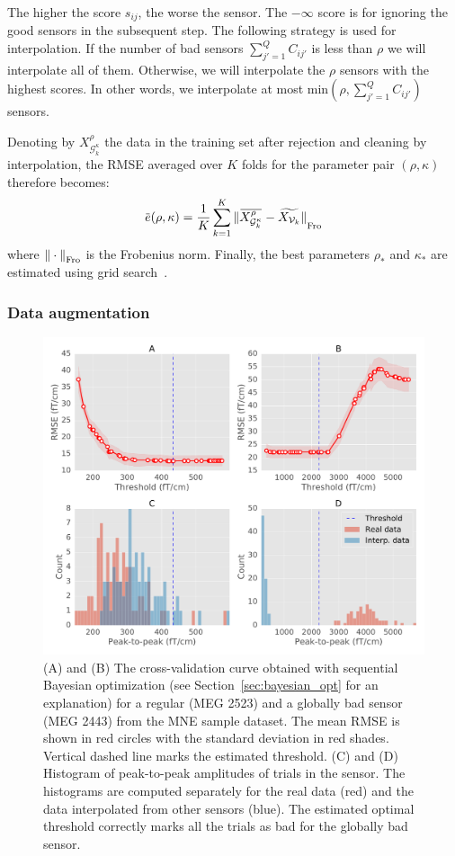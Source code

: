The higher the score $s_{ij}$, the worse the sensor. The $-\infty$ score is for ignoring the good sensors in the subsequent step. The following strategy is used for interpolation.
%
%
If the number of bad sensors $\sum_{j'=1}^{Q} C_{ij'}$ is less than $\rho$ we will interpolate all of them. Otherwise, we will interpolate the $\rho$ sensors with the highest scores.
In other words, we interpolate at most $\mathrm{min}(\rho, \sum_{j'=1}^{Q} C_{ij'})$ sensors.
%
%
%
%
%
%
%
%
%
%
%

Denoting by $X^{\rho}_{\mathcal{G}^{\kappa}_k}$ the data in the training set after rejection and cleaning by interpolation, the RMSE averaged over $K$ folds for the parameter pair $(\rho, \kappa)$ therefore becomes:
%
\begin{equation}
\overbar{e}(\rho, \kappa) = \frac{1}{K} \sum_{k=1}^{K} \fro{\overbar{X^{\rho}_{\mathcal{G}^{\kappa}_k}} - \widetilde{X_{\mathcal{V}_k}}}
\end{equation}
where ${\| \cdot \|}_{\mathrm{Fro}}$ is the Frobenius norm.
Finally, the best parameters $\rho_{*}$ and $\kappa_{*}$ are estimated using grid search~\citep{hsu2003practical}.
%

\subsubsection{Data augmentation}
\label{sec:data_augmentation}

\begin{figure}[ht!]
    \centering
    \includegraphics[width=0.8\linewidth]{figures/figure2.pdf}
    \caption[Sequential Bayesian optimization cross-validation curves]{(A) and (B) The cross-validation curve obtained with sequential Bayesian optimization (see Section~\ref{sec:bayesian_opt} for an explanation) for a regular (MEG 2523) and a globally bad sensor (MEG 2443) from the MNE sample dataset. The mean \ac{RMSE} is shown in red circles with the standard deviation in red shades. Vertical dashed line marks the estimated threshold. (C) and (D) Histogram of peak-to-peak amplitudes of trials in the sensor. The histograms are computed separately for the real data (red) and the data interpolated from other sensors (blue). The estimated optimal threshold correctly marks all the trials as bad for the globally bad sensor.}
    \label{fig:cross_val_hist}
\end{figure}

